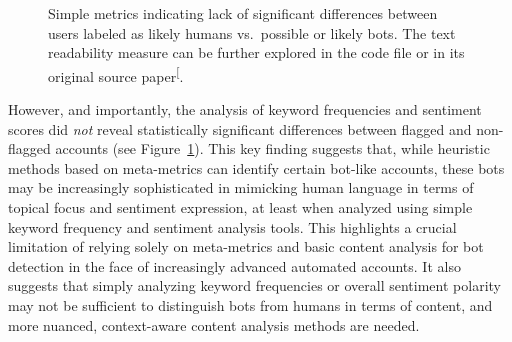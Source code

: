 \documentclass[
  12pt,
  letterpaper,
  DIV=11,
  numbers=noendperiod,
  abstract]{scrartcl}
\begin{document}
\begin{figure}


\caption{\label{fig-comparison}Simple metrics indicating lack of
significant differences between users labeled as likely humans
vs.~possible or likely bots. The text readability measure can be further
explored in the code file or in its original source
paper\textsuperscript{{[}\citeproc{ref-kincaid1975flesch}{30}{]}}.}

\end{figure}%

However, and importantly, the analysis of keyword frequencies and
sentiment scores did \emph{not} reveal statistically significant
differences between flagged and non-flagged accounts (see
Figure~\ref{fig-comparison}). This key finding suggests that, while
heuristic methods based on meta-metrics can identify certain bot-like
accounts, these bots may be increasingly sophisticated in mimicking
human language in terms of topical focus and sentiment expression, at
least when analyzed using simple keyword frequency and sentiment
analysis tools. This highlights a crucial limitation of relying solely
on meta-metrics and basic content analysis for bot detection in the face
of increasingly advanced automated accounts. It also suggests that
simply analyzing keyword frequencies or overall sentiment polarity may
not be sufficient to distinguish bots from humans in terms of content,
and more nuanced, context-aware content analysis methods are needed.
\end{document}
